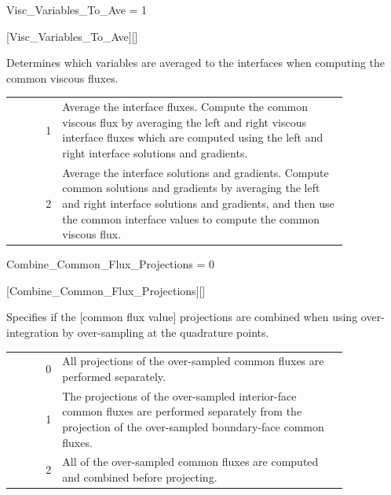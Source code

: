
\begin{nmldescitem}
Visc_Variables_To_Ave = 1
\end{nmldescitem}
[Visc\_Variables\_To\_Ave][]

\begin{nmldescbody}
Determines which variables are averaged to the interfaces when computing the
common viscous fluxes.
\\
\begin{tabular}{ @{\qquad} r @{ = } p{0.85\linewidth} @{} }
  1 & Average the interface fluxes. Compute the common viscous flux by
      averaging the left and right viscous interface fluxes which are computed
      using the left and right interface solutions and gradients. \\
  2 & Average the interface solutions and gradients. Compute common solutions
      and gradients by averaging the left and right interface solutions and
      gradients, and then use the common interface values to compute the common
      viscous flux.
\end{tabular}
\end{nmldescbody}


\begin{nmldescitem}
Combine_Common_Flux_Projections = 0
\end{nmldescitem}
[Combine\_Common\_Flux\_Projections][]

\begin{nmldescbody}
Specifies if the [common flux value] projections
are combined when using over-integration by over-sampling at the quadrature points.
\\
\begin{tabular}{ @{\qquad} r @{ = } p{0.85\linewidth} @{} }
  0 & All projections of the over-sampled common fluxes are performed
      separately. \\
  1 & The projections of the over-sampled interior-face common fluxes are
      performed separately from the projection of the over-sampled boundary-face
      common fluxes.\\
  2 & All of the over-sampled common fluxes are computed and combined before
      projecting.
\end{tabular}
\end{nmldescbody}

